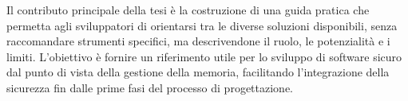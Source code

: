\vspace{0.25em}

Il contributo principale della tesi è la costruzione di una guida pratica che permetta
agli sviluppatori di orientarsi tra le diverse soluzioni disponibili, senza
raccomandare strumenti specifici, ma descrivendone il ruolo, le potenzialità e i
limiti. L'obiettivo è fornire un riferimento utile per lo sviluppo di software sicuro
dal punto di vista della gestione della memoria, facilitando l'integrazione
della sicurezza fin dalle prime fasi del processo di progettazione.
